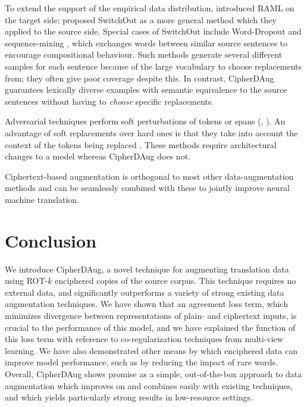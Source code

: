 \documentclass[11pt]{article}
\begin{document}
To extend the support of the empirical data distribution, \citet{Norouzi2016RewardAM} introduced RAML on the target side; \citet{wang-etal-2018-switchout} proposed SwitchOut as a more general method which they applied to the source side. Special cases of SwitchOut include Word-Dropout and sequence-mixing \cite{guo-etal-2020-sequence}, which exchanges words between similar source sentences to encourage compositional behaviour. Such methods generate several different samples for each sentence because of the large vocabulary to choose replacements from; they often give poor coverage despite this. In contrast, CipherDAug guarantees lexically diverse examples with semantic equivalence to the source sentences without having to \emph{choose} specific replacements.

Adversarial techniques \cite{gao-etal-2019-soft} perform soft perturbations of tokens or spans (\hbox{\citealt{takase-kiyono-2021-rethinking}}, \citealt{karpukhin-etal-2019-training}). An advantage of soft replacements over hard ones is that they take into account the context of the tokens being replaced \cite{liu-etal-2021-counterfactual, mohiuddin-etal-2021-augvic}. These methods require architectural changes to a model whereas CipherDAug does not. 

Ciphertext-based augmentation is orthogonal to most other data-augmentation methods and can be seamlessly combined with these to jointly improve neural machine translation.

\section{Conclusion}
We introduce CipherDAug, a novel technique for augmenting translation data using ROT-$k$ enciphered copies of the source corpus. This technique requires no external data, and significantly outperforms a variety of strong existing data augmentation techniques.
We have shown that an agreement loss term, which minimizes divergence between representations of plain- and ciphertext inputs, is crucial to the performance of this model, and we have explained the function of this loss term with reference to co-regularization techniques from multi-view learning.
We have also demonstrated other means by which enciphered data can improve model performance, such as by reducing the impact of rare words. Overall, CipherDAug shows promise as a simple, out-of-the-box approach to data augmentation which improves on and combines easily with existing techniques, and which yields particularly strong results in low-resource settings.
\end{document}
